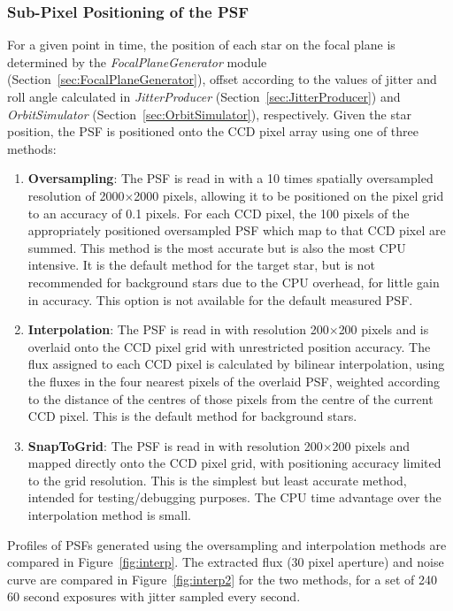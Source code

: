 \documentclass[11pt]{article}      %
\def\HCode#1{}
\def\htmlanchor#1{\HCode{<a id="#1"></a>}}
\begin{document}
\htmlanchor{psfPositioningMethod}
\subsubsection{Sub-Pixel Positioning of the PSF}
\label{sec:psfPositioning}

For a given point in time, the position of each star on the focal plane is determined by the {\it FocalPlaneGenerator} module (Section~\ref{sec:FocalPlaneGenerator}), offset according to the values of jitter and roll angle calculated in {\it JitterProducer}  (Section~\ref{sec:JitterProducer}) and {\it OrbitSimulator} (Section~\ref{sec:OrbitSimulator}), respectively. Given the star position, the PSF is positioned onto the CCD pixel array using one of three methods:

\begin{enumerate}
\item {\bf Oversampling}: The PSF is read in with a 10 times spatially oversampled resolution of 2000$\times$2000 pixels, allowing it to be positioned on the pixel grid to an accuracy of 0.1 pixels. For each CCD pixel, the 100 pixels of the appropriately positioned oversampled PSF which map to that CCD pixel are summed. This method is the most accurate but is also the most CPU intensive. It is the default method for the target star, but is not recommended for background stars due to the CPU overhead, for little gain in accuracy. This option is not available for the default measured PSF.
\item {\bf Interpolation}: The PSF is read in with resolution 200$\times$200 pixels and is overlaid onto the CCD pixel grid with unrestricted position accuracy. The flux assigned to each CCD pixel is calculated by bilinear interpolation, using the fluxes in the four nearest pixels of the overlaid PSF, weighted according to the distance of the centres of those pixels from the centre of the current CCD pixel. This is the default method for background stars.
\item {\bf SnapToGrid}: The PSF is read in with resolution 200$\times$200 pixels and mapped directly onto the CCD pixel grid, with positioning accuracy limited to the grid resolution. This is the simplest but least accurate method, intended for testing/debugging purposes. The CPU time advantage over the interpolation method is small.
\end{enumerate}

Profiles of PSFs generated using the oversampling and interpolation methods are compared in Figure~\ref{fig:interp}. The extracted flux (30 pixel aperture) and noise curve are compared in Figure~\ref{fig:interp2} for the two methods, for a set of 240 60 second exposures with jitter sampled every second.
\end{document}
